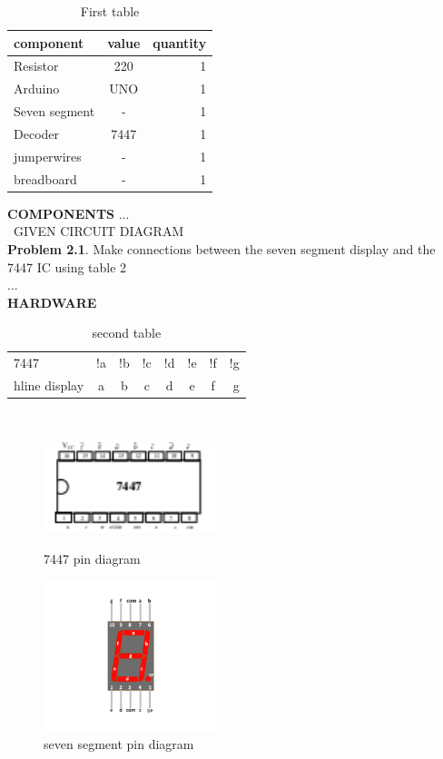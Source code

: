 \documentclass{article}
\begin{document}
 \begin{table}[ht]
            \centering
            \begin{tabular}{|l|c|r|}
            \hline
        component & value & quantity\\
        \hline

Resistor & 220 & 1\\
\hline
Arduino & UNO & 1\\
\hline
Seven segment & - & 1\\
\hline
Decoder & 7447& 1\\
\hline
jumperwires & - & 1\\
\hline
breadboard & - & 1\\
\hline
\end{tabular}
\caption{First table}
\label{tab:first table}
\end{table}
\textbf{COMPONENTS}
...\\\
GIVEN CIRCUIT DIAGRAM \\
\textbf{Problem 2.1}. Make connections between the seven
segment display  and the 7447 IC using table 2\\
...\\
\textbf{HARDWARE}
 \begin{table}[ht]
            \centering
            \begin{tabular}{|l|c|c|c|c|c|c|r|}
            \hline
            7447 & !a & !b & !c & !d & !e & !f & !g
            \\hline
            display & a & b & c & d & e & f & g\\
            \hline
            \end{tabular}
\caption{second table}
\label{tab:second table}
\end{table}\\
\begin{figure}[ht]
\centering
\begin{minipage}[b]{.49\textwidth}
    \includegraphics[width=2in]{7447ic.png}
    \caption{7447 pin diagram}
    \label{fig:7447 pin diagram}
     \end{minipage}
\begin{minipage}[b]{.49\textwidth}
\includegraphics[width=2in]{seven segment.png}
    \caption{seven segment pin diagram}
    \label{fig:seven segment pin diagram}
     \end{minipage}
\end{figure}
\end{document}
